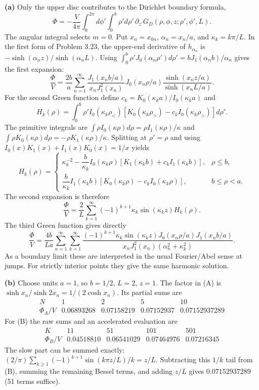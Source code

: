 \textbf{(a)} Only the upper disc contributes to the Dirichlet
boundary formula,
\[
\Phi=-\frac V{4\pi}\int_0^{2\pi}d\phi'\int_0^b\rho'd\rho'
\,\partial_{z'}G_D(\rho,\phi,z;\rho',\phi',L).
\]
The angular integral selects $m=0$.  Put $x_n=x_{0n}$,
$\alpha_n=x_n/a$, and $\kappa_k=k\pi/L$.
In the first form of Problem 3.23, the upper-end derivative of
$h_{\alpha_n}$ is $-\sinh(\alpha_nz)/\sinh(\alpha_nL)$.
Using $\int_0^b\rho'J_0(\alpha_n\rho')d\rho'=bJ_1(\alpha_nb)/\alpha_n$
gives the first expansion:
\[
\boxed{\frac\Phi V=\frac{2b}a\sum_{n=1}^\infty
\frac{J_1(x_nb/a)}{x_nJ_1^2(x_n)}J_0(x_n\rho/a)
\frac{\sinh(x_nz/a)}{\sinh(x_nL/a)}.}\tag{A}
\]
For the second Green function define
$c_k=K_0(\kappa_ka)/I_0(\kappa_ka)$ and
\[
H_k(\rho)=\int_0^b\rho'I_0(\kappa_k\rho_<)
[K_0(\kappa_k\rho_>)-c_kI_0(\kappa_k\rho_>)]d\rho'.
\]
The primitive integrals are
$\int\rho I_0(\kappa\rho)d\rho=\rho I_1(\kappa\rho)/\kappa$
and $\int\rho K_0(\kappa\rho)d\rho=-\rho K_1(\kappa\rho)/\kappa$.
Splitting at $\rho'=\rho$ and using
$I_0(x)K_1(x)+I_1(x)K_0(x)=1/x$ yields
\[
H_k(\rho)=\begin{cases}
\kappa_k^{-2}-\dfrac b{\kappa_k}I_0(\kappa_k\rho)
[K_1(\kappa_kb)+c_kI_1(\kappa_kb)],&\rho\leq b,\\[3pt]
\dfrac b{\kappa_k}I_1(\kappa_kb)
[K_0(\kappa_k\rho)-c_kI_0(\kappa_k\rho)],&b\leq\rho<a.
\end{cases}
\]
The second expansion is therefore
\[
\boxed{\frac\Phi V=\frac2L\sum_{k=1}^\infty
(-1)^{k+1}\kappa_k\sin(\kappa_kz)H_k(\rho).}\tag{B}
\]
The third Green function gives directly
\[
\boxed{\frac\Phi V=\frac{4b}{La}\sum_{n=1}^\infty\sum_{k=1}^\infty
\frac{(-1)^{k+1}\kappa_k\sin(\kappa_kz)
J_0(x_n\rho/a)J_1(x_nb/a)}
{x_nJ_1^2(x_n)(\alpha_n^2+\kappa_k^2)}.}\tag{C}
\]
As a boundary limit these are interpreted in the usual Fourier/Abel
sense at jumps.  For strictly interior points they give the same
harmonic solution.

\textbf{(b)} Choose units $a=1$, so $b=1/2$, $L=2$, $z=1$.
The factor in (A) is $\sinh x_n/\sinh2x_n=1/(2\cosh x_n)$.
Its partial sums are
\[
\begin{array}{c|rrrr}
N&1&2&5&10\\\hline
\Phi_A/V&0.06893268&0.07158219&0.07152937&0.07152937289
\end{array}
\]
For (B) the raw sums and an accelerated evaluation are
\[
\begin{array}{c|rrrr}
K&11&51&101&501\\\hline
\Phi_B/V&0.04518810&0.06541029&0.07464976&0.07216345
\end{array}
\]
The slow part can be summed exactly:
$(2/\pi)\sum_{k\geq1}(-1)^{k+1}\sin(k\pi z/L)/k=z/L$.
Subtracting this $1/k$ tail from (B), summing the remaining Bessel
terms, and adding $z/L$ gives $0.07152937289$ (51 terms suffice).

